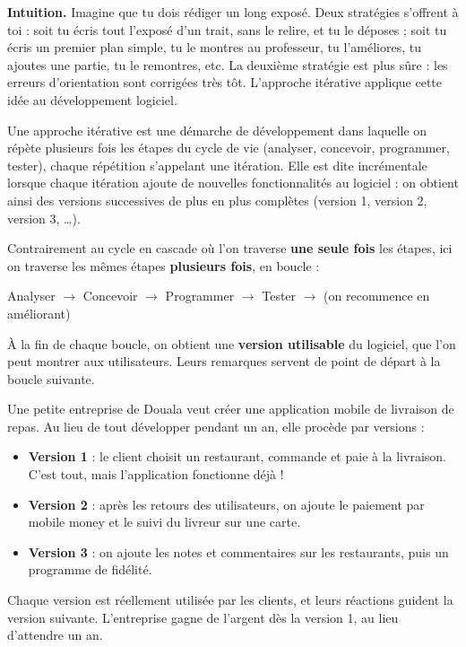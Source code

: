 \documentclass[11pt]{article}
\newcommand{\cle}[1]{{\popxbold\color{popdark}#1}}
\newcounter{popsec}
\newcounter{popsub}
\newcommand{\courssub}[1]{%
  \stepcounter{popsub}%
  \par\vspace{9pt}\noindent{\popxbold\fontsize{11.5}{13}\selectfont\color{popink}{\color{poporange}\thepopsec.\thepopsub}\hspace{6pt}#1}\par\nopagebreak\vspace{4pt}
}
\begin{document}
\courssub{L'approche itérative et incrémentale}

\textbf{Intuition.} Imagine que tu dois rédiger un long exposé. Deux stratégies s'offrent à toi : soit tu écris tout l'exposé d'un trait, sans le relire, et tu le déposes ; soit tu écris un premier plan simple, tu le montres au professeur, tu l'améliores, tu ajoutes une partie, tu le remontres, etc. La deuxième stratégie est plus sûre : les erreurs d'orientation sont corrigées très tôt. L'approche itérative applique cette idée au développement logiciel.

\begin{definition}
Une \cle{approche itérative} est une démarche de développement dans laquelle on répète plusieurs fois les étapes du cycle de vie (analyser, concevoir, programmer, tester), chaque répétition s'appelant une \cle{itération}. Elle est dite \cle{incrémentale} lorsque chaque itération ajoute de nouvelles fonctionnalités au logiciel : on obtient ainsi des versions successives de plus en plus complètes (version 1, version 2, version 3, \ldots).
\end{definition}

Contrairement au cycle en cascade où l'on traverse \textbf{une seule fois} les étapes, ici on traverse les mêmes étapes \textbf{plusieurs fois}, en boucle :

\begin{center}
Analyser $\rightarrow$ Concevoir $\rightarrow$ Programmer $\rightarrow$ Tester $\rightarrow$ (on recommence en améliorant)
\end{center}

À la fin de chaque boucle, on obtient une \textbf{version utilisable} du logiciel, que l'on peut montrer aux utilisateurs. Leurs remarques servent de point de départ à la boucle suivante.

\begin{exemplebox}
Une petite entreprise de Douala veut créer une application mobile de livraison de repas. Au lieu de tout développer pendant un an, elle procède par versions :
\begin{itemize}
\item \textbf{Version 1} : le client choisit un restaurant, commande et paie à la livraison. C'est tout, mais l'application fonctionne déjà !
\item \textbf{Version 2} : après les retours des utilisateurs, on ajoute le paiement par mobile money et le suivi du livreur sur une carte.
\item \textbf{Version 3} : on ajoute les notes et commentaires sur les restaurants, puis un programme de fidélité.
\end{itemize}
Chaque version est réellement utilisée par les clients, et leurs réactions guident la version suivante. L'entreprise gagne de l'argent dès la version 1, au lieu d'attendre un an.
\end{exemplebox}
\end{document}
